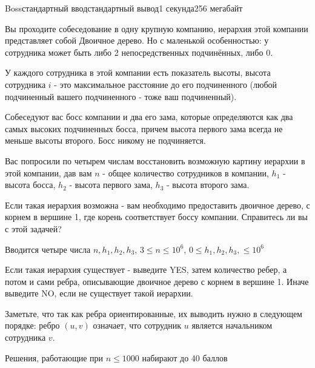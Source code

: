 \begin{problem}{Boss}{стандартный ввод}{стандартный вывод}{1 секунда}{256 мегабайт}

Вы проходите собеседование в одну крупную компанию, иерархия этой компании представляет собой Двоичное дерево. Но с маленькой особенностью: у сотрудника может быть либо 2 непосредственных подчинённых, либо 0.

У каждого сотрудника в этой компании есть показатель высоты, высота сотрудника $i$ - это максимальное расстояние до его подчиненного (любой подчиненный вашего подчиненного - тоже ваш подчиненный). 

Собеседуют вас босс компании и два его зама, которые определяются как два самых высоких подчиненных босса, причем высота первого зама всегда не меньше высоты второго. Босс никому не подчиняется.

Вас попросили по четырем числам восстановить возможную картину иерархии в этой компании, дав вам $n$ - общее количество сотрудников в компании, $h_1$ - высота босса, $h_2$ - высота первого зама, $h_3$ - высота второго зама.

Если такая иерархия возможна - вам необходимо предоставить двоичное дерево, с корнем в вершине 1, где корень соответствует боссу компании. Справитесь ли вы с этой задачей?

\InputFile
Вводится четыре числа $n, h_1, h_2, h_3$, $3 \leq n \leq 10^6$, $0 \leq h_1, h_2, h_3, \leq 10^6$

\OutputFile
Если такая иерархия существует - выведите YES, затем количество ребер, а потом и сами ребра, описывающие двоичное дерево с корнем в вершине 1. Иначе выведите NO, если не существует такой иерархии.

\Examples

\begin{example}
%
%
\end{example}

\Note
Заметьте, что так как ребра ориентированные, их выводить нужно в следующем порядке: ребро $(u, v)$ означает, что сотрудник $u$ является начальником сотрудника $v$.

Решения, работающие при $n \leq 1000$ набирают до 40 баллов

\end{problem}

